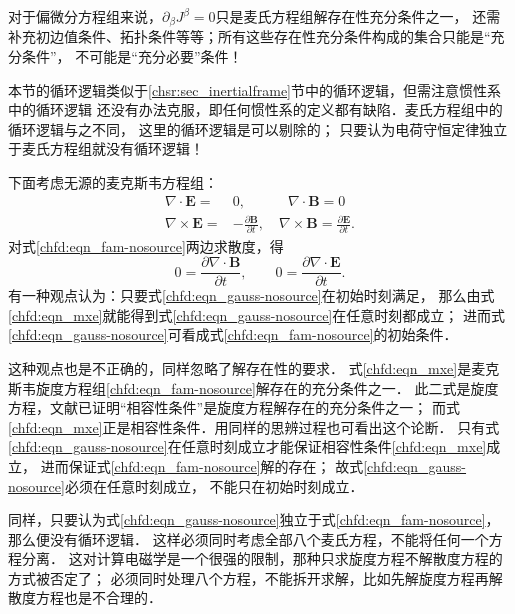 对于偏微分方程组来说，$\partial_{\beta} J^{\beta}=0$只是麦氏方程组解存在性充分条件之一，
还需补充初边值条件、拓扑条件等等；所有这些存在性充分条件构成的集合只能是“充分条件”，
不可能是“充分必要”条件！


本节的循环逻辑类似于\ref{chsr:sec_inertialframe}节中的循环逻辑，但需注意惯性系中的循环逻辑
还没有办法克服，即任何惯性系的定义都有缺陷．麦氏方程组中的循环逻辑与之不同，
这里的循环逻辑是可以剔除的；
只要认为电荷守恒定律独立于麦氏方程组就没有循环逻辑！


下面考虑无源的麦克斯韦方程组：
\begin{subequations}\label{chfd:eqn_maxwell-nosource}
    \begin{align}
        \nabla \cdot  \boldsymbol{E} =& 0, \qquad\quad
        \nabla \cdot  \boldsymbol{B} = 0  \label{chfd:eqn_gauss-nosource}\\
        \nabla \times \boldsymbol{E} =& -\frac{\partial \boldsymbol{B}}{\partial t} , \quad
        \nabla \times \boldsymbol{B} = \frac{\partial \boldsymbol{E}}{\partial t}.
        \label{chfd:eqn_fam-nosource}
    \end{align}
\end{subequations}
对式\eqref{chfd:eqn_fam-nosource}两边求散度，得
\begin{equation}\label{chfd:eqn_mxe}
    0 = \frac{\partial \nabla \cdot\boldsymbol{B}}{\partial t} , \qquad
    0 = \frac{\partial \nabla \cdot\boldsymbol{E}}{\partial t}.
\end{equation}
有一种观点认为：只要式\eqref{chfd:eqn_gauss-nosource}在初始时刻满足，
那么由式\eqref{chfd:eqn_mxe}就能得到式\eqref{chfd:eqn_gauss-nosource}在任意时刻都成立；
进而式\eqref{chfd:eqn_gauss-nosource}可看成式\eqref{chfd:eqn_fam-nosource}的初始条件．

这种观点也是不正确的，同样忽略了解存在性的要求．
式\eqref{chfd:eqn_mxe}是麦克斯韦旋度方程组\eqref{chfd:eqn_fam-nosource}解存在的充分条件之一．
此二式是旋度方程，文献\parencite{aramaki-2014}已证明“相容性条件”是旋度方程解存在的充分条件之一；
而式\eqref{chfd:eqn_mxe}正是相容性条件．用同样的思辨过程也可看出这个论断．
只有式\eqref{chfd:eqn_gauss-nosource}在任意时刻成立才能保证相容性条件\eqref{chfd:eqn_mxe}成立，
进而保证式\eqref{chfd:eqn_fam-nosource}解的存在；
故式\eqref{chfd:eqn_gauss-nosource}必须在任意时刻成立，
不能只在初始时刻成立．


同样，只要认为式\eqref{chfd:eqn_gauss-nosource}独立于式\eqref{chfd:eqn_fam-nosource}，那么便没有循环逻辑．
这样必须同时考虑全部八个麦氏方程，不能将任何一个方程分离．
这对计算电磁学是一个很强的限制，那种只求旋度方程不解散度方程的方式被否定了；
必须同时处理八个方程，不能拆开求解，比如先解旋度方程再解散度方程也是不合理的．


